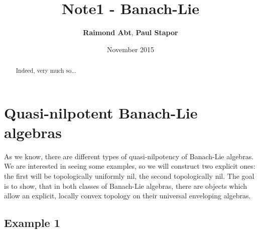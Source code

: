 \documentclass[
11pt,                          %
english                        %
]{article}
\title{Note1 - Banach-Lie}
\author{
  \textbf{Raimond Abt},
  \textbf{Paul Stapor}
  \\[0.5cm]
}
\date{November 2015}
\begin{document}
%

\maketitle

\begin{abstract}
    Indeed, very much so...
\end{abstract}

\tableofcontents

\newpage

\section{Quasi-nilpotent Banach-Lie algebras}

As we know, there are different types of quasi-nilpotency of Banach-Lie algebras.
We are interested in seeing some examples, so we will construct two explicit ones:
the first will be topologically uniformly nil, the second topologically nil.
The goal is to show, that in both classes of Banach-Lie algebras, there are objects
which allow an explicit, locally convex topology on their universal enveloping 
algebras.



\subsection{Example 1}
\end{document}
